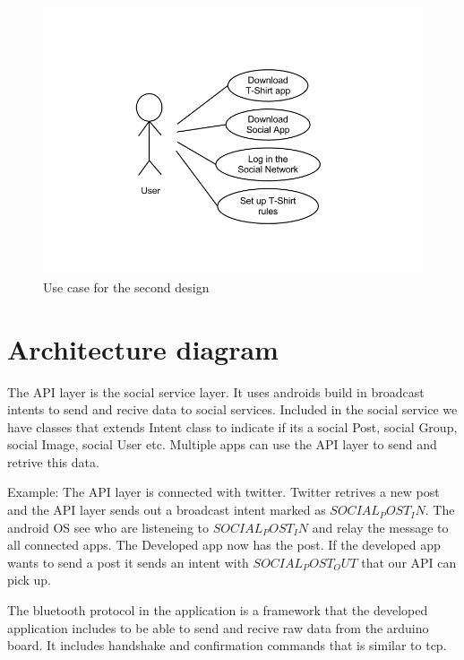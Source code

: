 \begin{figure}[h!]
\centering \includegraphics[scale=0.35]{img/use-case2.png}
\caption{Use case for the second design}
\label{fig:use-case2}
\end{figure}

\newpage
\section{Architecture diagram}
The API layer is the social service layer. It uses androids build in broadcast intents to send and
recive data to social services. Included in the social service we have classes that extends Intent
class to indicate if its a social Post, social Group, social Image, social User etc. Multiple apps
can use the API layer to send and retrive this data.

Example:
The API layer is connected with twitter. Twitter retrives a new post and the API layer sends out
a broadcast intent marked as $SOCIAL_POST_IN$. The android OS see who are listeneing to $SOCIAL_POST_IN$ and relay the message to all connected apps. The Developed app now has the post. If the developed app wants to send a post it sends an intent with $SOCIAL_POST_OUT$ that our API can pick up.

The bluetooth protocol in the application is a framework that the developed application includes
to be able to send and recive raw data from the arduino board. It includes handshake and
confirmation commands that is similar to tcp.


